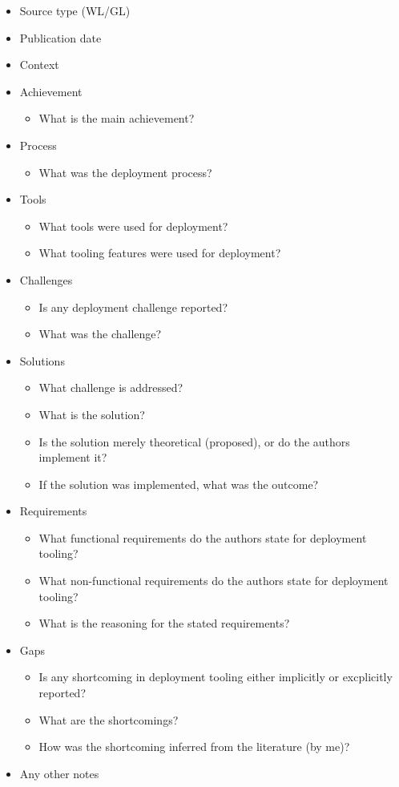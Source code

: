 \begin{itemize}
    \item Source type (WL/GL)
    \item Publication date
    \item Context
    \item Achievement
    \begin{itemize}
        \item What is the main achievement?
    \end{itemize}
    \item Process
    \begin{itemize}
        \item What was the deployment process?
    \end{itemize}
    \item Tools
    \begin{itemize}
        \item What tools were used for deployment?
        \item What tooling features were used for deployment?
    \end{itemize}
    \item Challenges
    \begin{itemize}
        \item Is any deployment challenge reported?
        \item What was the challenge?
    \end{itemize}
    \item Solutions
    \begin{itemize}
        \item What challenge is addressed?
        \item What is the solution?
        \item Is the solution merely theoretical (proposed), or do the authors implement it?
        \item If the solution was implemented, what was the outcome?
    \end{itemize}
    \item Requirements
    \begin{itemize}
        \item What functional requirements do the authors state for deployment tooling?
        \item What non-functional requirements do the authors state for deployment tooling?
        \item What is the reasoning for the stated requirements?
    \end{itemize}
    \item Gaps
    \begin{itemize}
        \item Is any shortcoming in deployment tooling either implicitly or excplicitly reported?
        \item What are the shortcomings?
        \item How was the shortcoming inferred from the literature (by me)?
    \end{itemize}
    \item Any other notes
\end{itemize}

